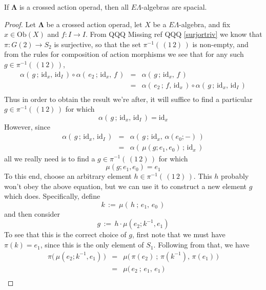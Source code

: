 \documentclass{amsbook} %
\newcommand{\ML}{\mathbf{\Lambda}}
\numberwithin{section}{chapter}
\begin{document}
\begin{lem}\label{spacial} If $\ML$ is a crossed action operad, then all $E\Lambda$-algebras are spacial.\end{lem}
\begin{proof}
Let $\ML$ be a crossed action operad, let $X$ be a $E\Lambda$-algebra, and fix $x \in \mathrm{Ob}(X)$ and \( f: I \to I \). From QQQ Missing ref QQQ \cref{surjortriv} we know that \( \pi : G(2) \to S_2 \) is surjective, so that the set $\pi^{-1}( \, (1 \, 2) \, )$ is non-empty, and from the rules for composition of action morphisms we see that for any such $g \in \pi^{-1}( \, (1 \, 2) \, )$,
\[\begin{array}{rll}
		\alpha( \, g \, ; \, \mathrm{id}_x, \, \mathrm{id}_I \, ) \circ \alpha( \, e_2 \, ; \, \mathrm{id}_x, \, f \, ) & = & \alpha( \, g \, ; \, \mathrm{id}_x, \, f \, ) \\
		& = & \alpha( \, e_2 \, ; \, f, \, \mathrm{id}_x \, ) \circ \alpha( \, g \, ; \, \mathrm{id}_x, \, \mathrm{id}_I \, ) \\
		\end{array}
\]
Thus in order to obtain the result we're after, it will suffice to find a particular $g \in \pi^{-1}( \, (1 \, 2) \, )$ for which
\[\alpha( \, g \, ; \, \mathrm{id}_x, \, \mathrm{id}_I \, ) = \mathrm{id}_x \]
However, since
\[\begin{array}{rll}
		\alpha( \, g \, ; \, \mathrm{id}_x, \, \mathrm{id}_I \, ) & = & \alpha( \, g \, ; \, \mathrm{id}_x, \, \alpha( e_0; - ) \, ) \\
		& = & \alpha( \, \mu(g; e_1, e_0) \, ; \, \mathrm{id}_x \, )
		\end{array}
\]
all we really need is to find a $g \in \pi^{-1}( \, (1 \, 2) \, )$ for which
\[ \mu(g; e_1, e_0) = e_1 \]
To this end, choose an arbitrary element $h \in \pi^{-1}( \, (1 \, 2) \, )$. This $h$ probably won't obey the above equation, but we can use it to construct a new element $g$ which does. Specifically, define
\[ k \, := \, \mu( \, h \ ; \, e_1, \, e_0 \, ) \]
and then consider
\[ g \, := \, h \cdot \mu(e_2; k^{-1}, e_1) \] 
To see that this is the correct choice of $g$, first note that we must have \( \pi(k) = e_1 \), since this is the only element of $S_1$. Following from that, we have 
\[\begin{array}{rll}
		\pi \big( \, \mu(e_2; k^{-1}, e_1) \, \big) & = & \mu \big( \, \pi(e_2) \ ; \, \pi(k^{-1}), \, \pi(e_1) \, \big) \\
		& = & \mu \big( \, e_2  \ ; \, e_1, \, e_1 \, \big) \\

\end{array}\]
\end{proof}
\end{document}
